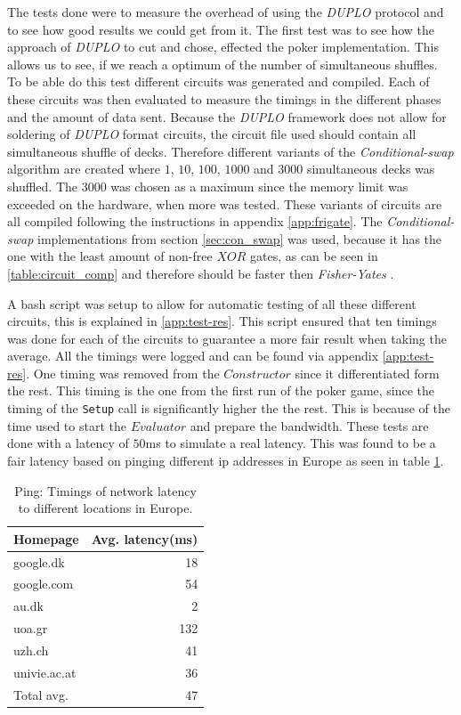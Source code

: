 \documentclass[twoside,11pt,openright]{report}
\newcommand{\FY}{\textit{Fisher-Yates} }
\newcommand{\CS}{\textit{Conditional-swap} }
\newcommand{\DUPLO}{\textit{DUPLO} }
\begin{document}
The tests done were to measure the overhead of using the \DUPLO protocol and to see how good results we could get from it. The first test was to see how the approach of \DUPLO to cut and chose, effected the poker implementation. This allows us to see, if we reach a optimum of the number of simultaneous shuffles. To be able do this test different circuits was generated and compiled. Each of these circuits was then evaluated to measure the timings in the different phases and the amount of data sent. Because the \DUPLO framework does not allow for soldering of \DUPLO format circuits, the circuit file used should contain all simultaneous shuffle of decks. Therefore different variants of the \CS algorithm are created where $1$, $10$, $100$, $1000$ and $3000$ simultaneous decks was shuffled. The $3000$ was chosen as a maximum since the memory limit was exceeded on the hardware, when more was tested. These variants of circuits are all compiled following the instructions in appendix \ref{app:frigate}. The \CS implementations from section \ref{sec:con_swap} was used, because it has the one with the least amount of non-free $XOR$ gates, as can be seen in \ref{table:circuit_comp} and therefore should be faster then \FY.

A bash script was setup to allow for automatic testing of all these different circuits, this is explained in \ref{app:test-res}. This script ensured that ten timings was done for each of the circuits to guarantee a more fair result when taking the average. All the timings were logged and can be found via appendix \ref{app:test-res}. One timing was removed from the $Constructor$ since it differentiated form the rest. This timing is the one from the first run of the poker game, since the timing of the \verb|Setup| call is significantly higher the the rest. This is because of the time used to start the $Evaluator$ and prepare the bandwidth. These tests are done with a latency of $50$ms to simulate a real latency. This was found to be a fair latency based on pinging different ip addresses in Europe as seen in table \ref{table:ping}. 

\begin{table}[t]
\centering
\begin{tabular}{l || r}
Homepage & Avg. latency(ms)    \\
\hline
google.dk    &  18    \\
google.com   &  54    \\
au.dk        &   2    \\
uoa.gr       & 132    \\
uzh.ch       &  41    \\
univie.ac.at &  36    \\
\hline
Total avg.   &  47
\end{tabular}
\caption{Ping: Timings of network latency to different locations in Europe.}
\label{table:ping}
\end{table}
\end{document}
